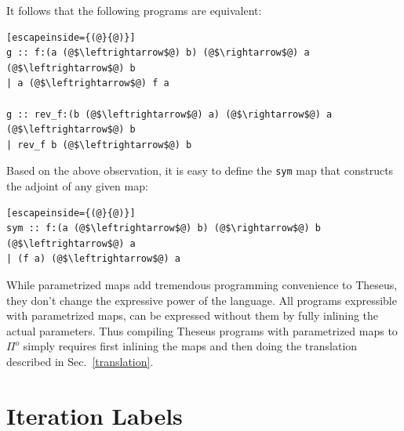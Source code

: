 \documentclass{article}
\newcommand{\ctr}[1]{{\scriptsize{\texttt{#1}}}}
\begin{document}
\noindent
It follows that the following programs are equivalent:
\vspace{-10pt}
\begin{multicols}{2}
\begin{lstlisting}[escapeinside={(@}{@)}]
g :: f:(a (@$\leftrightarrow$@) b) (@$\rightarrow$@) a (@$\leftrightarrow$@) b
| a (@$\leftrightarrow$@) f a

g :: rev_f:(b (@$\leftrightarrow$@) a) (@$\rightarrow$@) a (@$\leftrightarrow$@) b
| rev_f b (@$\leftrightarrow$@) b
 \end{lstlisting}
\end{multicols}
\vspace{-15pt}
\noindent
Based on the above observation, it is easy to define the \ctr{sym} map that
constructs the adjoint of any given map:
\vspace{-5pt}
\begin{lstlisting}[escapeinside={(@}{@)}]
sym :: f:(a (@$\leftrightarrow$@) b) (@$\rightarrow$@) b (@$\leftrightarrow$@) a
| (f a) (@$\leftrightarrow$@) a
 \end{lstlisting}
While parametrized maps add tremendous programming convenience to Theseus,
they don't change the expressive power of the language. All programs
expressible with parametrized maps, can be expressed without them by fully
inlining the actual parameters. Thus compiling Theseus programs with
parametrized maps to \ensuremath{\Pi^{o}} simply requires first inlining the maps and then
doing the translation described in Sec.~\ref{translation}.

\section{Iteration Labels}
\label{theseusIII}
\label{add1}
\end{document}

